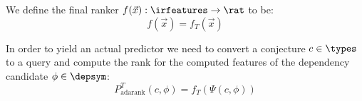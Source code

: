 \begin{definition}
  We define the final ranker $f(\vec{x}) : \irfeatures \rightarrow \rat$ to be:
  $$ f(\vec{x}) = f_T(\vec{x})$$
\end{definition}

\begin{definition}
  In order to yield an actual predictor we need to convert a conjecture $c \in \types$
  to a query and compute the rank for the computed features of the dependency candidate $\phi \in \depsym$:
  $$ P_{\text{adarank}}^T(c, \phi) = f_T(\Psi(c, \phi)) $$
\end{definition}
